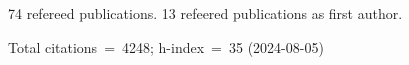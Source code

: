 74 refereed publications. 13 refeered publications as first author.

Total citations~=~4248; h-index~=~35 (2024-08-05)